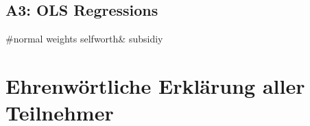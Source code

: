 \documentclass[12pt, a4paper, titlepage]{article}\usepackage[]{graphicx}\usepackage[]{color}
\makeatletter
\newenvironment{kframe}{%
 \def\at@end@of@kframe{}%
 \ifinner\ifhmode%
  \def\at@end@of@kframe{\end{minipage}}%
  \begin{minipage}{\columnwidth}%
 \fi\fi%
 \def\FrameCommand##1{\hskip\@totalleftmargin \hskip-\fboxsep
 \colorbox{shadecolor}{##1}\hskip-\fboxsep
     \hskip-\linewidth \hskip-\@totalleftmargin \hskip\columnwidth}%
 \MakeFramed {\advance\hsize-\width
   \@totalleftmargin\z@ \linewidth\hsize
   \@setminipage}}%
 {\par\unskip\endMakeFramed%
 \at@end@of@kframe}
\makeatother
\begin{document}
\subsection{A3: OLS Regressions}

#normal weights selfworth& subsidiy


\begin{kframe}


{\ttfamily\noindent\bfseries{}}\end{kframe}

\section{Ehrenwörtliche Erklärung aller Teilnehmer}
\end{document}
